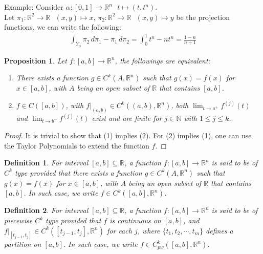 \documentclass[15pt]{book}
\theoremstyle{break}
\theoremstyle{break}
\newtheorem{prop}[lem]{Proposition}
\newtheorem{defn}{Definition}[corL]
\newcommand{\R}{\mathbb{R}}
\newcommand{\N}{\mathbb{N}}
\newcommand{\example}{\color{green}Example: \color{black}}
\begin{document}
\example Consider $\alpha : [0,1]\to \R^n \ \ \ t\mapsto (t,t^n)$.\\ Let $\pi_1:\R^2 \to \R \ \ \ (x,y)\mapsto x$, $\pi_2:\R^2 \to \R \ \ \ (x,y)\mapsto y$ be the projection functions, we can write the following:
\begin{align*}
\int_{Y_\alpha} \pi_2\, d\pi_1 - \pi_1\, d\pi_2 = \int_0^1 t^n  - n t^{n} = \frac{1-n}{n+1}
\end{align*}

\begin{prop}
Let $f:[a,b]\to \R^n$, the followings are equivalent:
\begin{enumerate}[topsep=3pt,itemsep=-1ex,partopsep=1ex,parsep=1ex]
\item There exists a function $g\in C^k(A,\R^n)$ such that $g(x) = f(x)$ for $x\in [a,b]$, with $A$ being an open subset of $\R$ that contains $[a,b]$.
\item $f \in C([a,b])$, with $f|_{(a,b)} \in C^k((a,b),\R^n)$, both $\lim_{t \to a^+} f^{(j)}(t)$ and $\lim_{t \to b^-}f^{(j)}(t)$ exist and are finite for $j\in \N$ with $1\leq j \leq k$.
\end{enumerate}
\end{prop}
\begin{proof}
It is trivial to show that (1) implies (2). For (2) implies (1), one can use the Taylor Polynomials to extend the function $f$. 
\end{proof}

\begin{defn}
For interval $[a,b]\subseteq \R$, a function $f:[a,b] \to \R^n$ is said to be of $C^k$ type provided that there exists a function $g\in C^k(A,\R^n)$ such that $g(x) = f(x)$ for $x\in [a,b]$, with $A$ being an open subset of $\R$ that contains $[a,b]$. In such case, we write $f \in C^k([a,b],\R^n)$. 
\end{defn}

\begin{defn}
For interval $[a,b]\subseteq \R$, a function $f:[a,b] \to \R^n$ is said to be of piecewise $C^k$ type provided that $f$ is continuous on $[a,b]$, and $f|_{[t_{j-1},t_j]} \in C^k([t_{j-1},t_j],\R^n)$ for each $j$, where $\{t_1,t_2,\cdots, t_m\}$ defines a partition on $[a,b]$. In such case, we write $f \in C_{pw}^k([a,b],\R^n)$. 
\end{defn}
\end{document}
